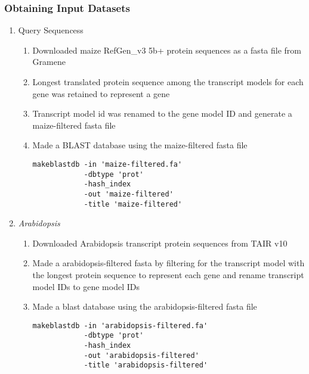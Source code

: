   \subsubsection{Obtaining Input Datasets}
  \begin{enumerate}
    \item Query Sequencess
    \begin{enumerate}
      \item Downloaded maize RefGen\_v3 5b+ protein sequences as a fasta file from Gramene
      \item Longest translated protein sequence among the transcript models for each gene was retained to represent a gene
      \item Transcript model id was renamed to the gene model ID and generate a maize-filtered fasta file
      \item Made a BLAST database using the maize-filtered fasta file
            \begin{verbatim}
makeblastdb -in 'maize-filtered.fa'
            -dbtype 'prot'
            -hash_index
            -out 'maize-filtered'
            -title 'maize-filtered'
            \end{verbatim}
    \end{enumerate}
    \item \emph{Arabidopsis}
    \begin{enumerate}
      \item Downloaded Arabidopsis transcript protein sequences from TAIR v10
      \item Made a arabidopsis-filtered fasta by filtering for the transcript model with the longest protein sequence to represent each gene and rename transcript model IDs to gene model IDs
      \item Made a blast database using the arabidopsis-filtered fasta file \\
            \begin{verbatim}
makeblastdb -in 'arabidopsis-filtered.fa'
            -dbtype 'prot'
            -hash_index
            -out 'arabidopsis-filtered'
            -title 'arabidopsis-filtered'
            \end{verbatim}


\end{enumerate}
\end{enumerate}
